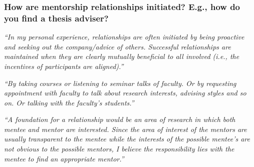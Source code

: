 \documentclass[12pt]{beamer}
\newcommand\ans[1]{{\it ``#1''}}
\newcommand\gap{\vspace{5mm}}
\begin{document}
\begin{frame} %
\frametitle{How are mentorship relationships initiated? E.g., how do you find a thesis adviser?}


\ans{In my personal experience, relationships are often initiated by being proactive and seeking  out  the  company/advice  of  others.   Successful  relationships  are  maintained  when they  are  clearly  mutually  beneficial  to  all  involved  (i.e.,  the  incentives  of  participants are aligned).}

\gap


\ans{By taking courses or listening to seminar talks of faculty.  Or by requesting appointment with faculty to talk about research interests, advising styles and so on.  Or talking with the faculty’s students.}


\end{frame}

\begin{frame}
  
\ans{A foundation for a relationship would be an area of research in which both mentee and mentor are interested.  Since the area of interest of the mentors are usually transparent to the mentee while the interests of the possible mentee’s are not obvious to the possible mentors, I believe the responsibility lies with the mentee to find an appropriate mentor.}







\end{frame}
\end{document}

